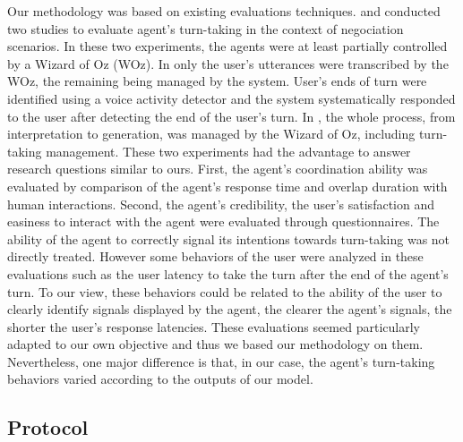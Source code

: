 Our methodology was based on existing evaluations techniques.
\cite{skantze_towards_2010} and \cite{de_vault_toward_2015} conducted two studies to evaluate agent's turn-taking in the context of negociation scenarios. In these two experiments, the agents were at least partially controlled by a Wizard of Oz (WOz). In \cite{skantze_towards_2010} only the user's utterances were transcribed by the WOz, the remaining being managed by the system. User's ends of turn were identified using a voice activity detector and the system systematically responded to the user after detecting the end of the user's turn. In \cite{de_vault_toward_2015}, the whole process, from interpretation to generation, was managed by the Wizard of Oz, including turn-taking management. These two experiments had the advantage to answer research questions similar to ours. First, the agent's coordination ability was evaluated by comparison of the agent's response time and overlap duration with human interactions. Second, the agent's credibility, the user's satisfaction and easiness to interact with the agent were evaluated through questionnaires. The ability of the agent to correctly signal its intentions towards turn-taking was not directly treated. However some behaviors of the user were analyzed in these evaluations such as the user latency to take the turn after the end of the agent's turn. To our view, these behaviors could be related to the ability of the user to clearly identify signals displayed by the agent, the clearer the agent's signals, the shorter the user's response latencies. These evaluations seemed particularly adapted to our own objective and thus we based our methodology on them. Nevertheless, one major difference is that, in our case, the agent's turn-taking behaviors varied according to the outputs of our model. 

\subsection{Protocol}

